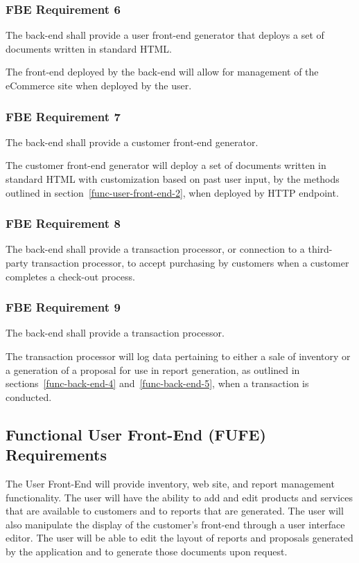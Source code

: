\documentclass{article}
\begin{document}
\subsubsection{FBE Requirement 6}
\label{func-back-end-6}

The back-end shall provide a user front-end generator that deploys a set of
documents written in standard HTML.

The front-end deployed by the back-end will allow for management of the
eCommerce site when deployed by the user.

\subsubsection{FBE Requirement 7}
\label{func-back-end-7}

The back-end shall provide a customer front-end generator.

The customer front-end generator will deploy a set of documents written in
standard HTML with customization based on past user input, by the methods
outlined in section~\ref{func-user-front-end-2}, when deployed by HTTP endpoint.

\subsubsection{FBE Requirement 8}
\label{func-back-end-8}

The back-end shall provide a transaction processor, or connection to a
third-party transaction processor, to accept purchasing by customers
when a customer completes a check-out process.

\subsubsection{FBE Requirement 9}
\label{func-back-end-9}

The back-end shall provide a transaction processor.

The transaction processor will log data pertaining to either a sale of inventory
or a generation of a proposal for use in report generation, as outlined in
sections~\ref{func-back-end-4} and~\ref{func-back-end-5}, when a transaction
is conducted.

\pagebreak
\subsection{Functional User Front-End (FUFE) Requirements}

The User Front-End will provide inventory, web site, and report management
functionality.  The user will have the ability to add and edit products and
services that are available to customers and to reports that are generated.  The
user will also manipulate the display of the customer's front-end through a
user interface editor.  The user will be able to edit the layout of reports and
proposals generated by the application and to generate those documents upon
request.
\end{document}
